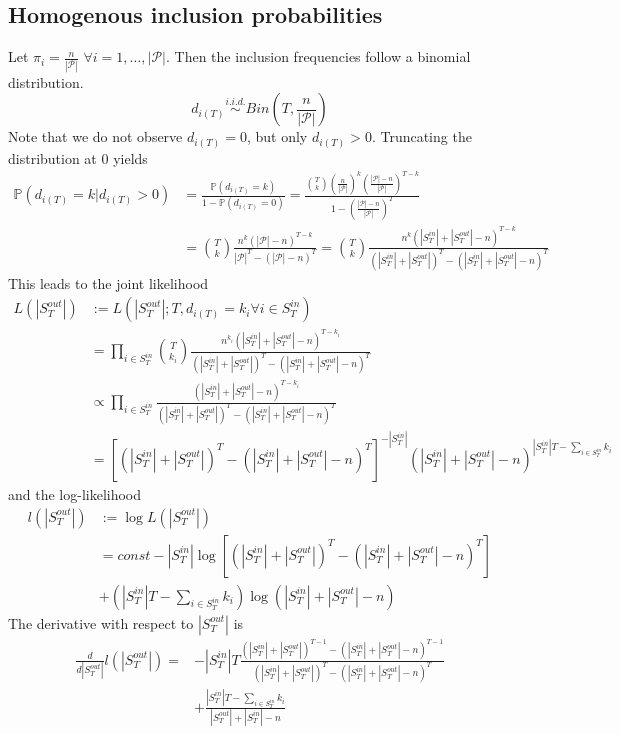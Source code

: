 \documentclass[a4paper, 12pt]{article}
\newcommand{\sout}{|S^{out}_T|}
\newcommand{\sint}{|S^{in}_T|}
\newcommand{\pop}{|\mathcal{P}|}
\begin{document}
\subsection{Homogenous inclusion probabilities}
Let $\pi_i = \frac{n}{\pop}$ $\forall i = 1, \dots, \pop$. Then the inclusion frequencies follow a binomial distribution.
\begin{equation*}
d_{i(T)} \overset{i.i.d.}{\sim} Bin(T, \frac{n}{\pop})
\end{equation*}
Note that we do not observe $d_{i(T)} = 0$, but only $d_{i(T)} > 0$. Truncating the distribution at 0 yields
\begin{align*}
\mathbb{P}(d_{i(T)} = k|d_{i(T)} > 0) &= \frac{\mathbb{P}(d_{i(T)} = k)}{1 - \mathbb{P}(d_{i(T)} = 0)} = \frac{\binom{T}{k} (\frac{n}{\pop})^k (\frac{\pop - n}{\pop})^{T - k}}{1 - (\frac{\pop - n}{\pop})^T}\\
&= \binom{T}{k} \frac{n^k (\pop - n)^{T-k}}{\pop^{T} - (\pop - n)^T} = \binom{T}{k} \frac{n^k (\sint + \sout - n)^{T-k}}{(\sint + \sout)^{T} - (\sint + \sout - n)^T}
\end{align*}
This leads to the joint likelihood
\begin{align*}
L(\sout) &:= L(\sout; T, d_{i(T)} = k_i \forall i \in S_T^{in}) \\
&= \prod_{i \in S_T^{in}} \binom{T}{k_i} \frac{n^{k_i} (\sint + \sout - n)^{T-k_i}}{(\sint + \sout)^{T} - (\sint + \sout - n)^T} \\
&\propto \prod_{i \in S_T^{in}} \frac{(\sint + \sout - n)^{T-k_i}}{(\sint + \sout)^{T} - (\sint + \sout - n)^T} \\
&= [(\sint + \sout)^{T} - (\sint + \sout - n)^T]^{-\sint} (\sint + \sout - n)^{\sint T - \sum_{i \in S_T^{in}} k_i}
\end{align*}
and the log-likelihood
\begin{align}
l(\sout) &:= \log L(\sout) \nonumber \\
&= const - \sint \log[(\sint + \sout)^{T} - (\sint + \sout - n)^T]\nonumber \\ 
&+ (\sint T - \sum_{i \in S_T^{in}} k_i) \log (\sint + \sout - n)
\end{align}
The derivative with respect to $\sout$ is
\begin{align}
\frac{d}{d\sout}l(\sout) =& -\sint T \frac{(\sint + \sout)^{T-1} - (\sint + \sout - n)^{T-1}}{(\sint + \sout)^{T} - (\sint + \sout - n)^T} \nonumber \\
&+ \frac{\sint T - \sum_{i \in S_T^{in}} k_i}{\sout + \sint - n}
\end{align}
\end{document}
